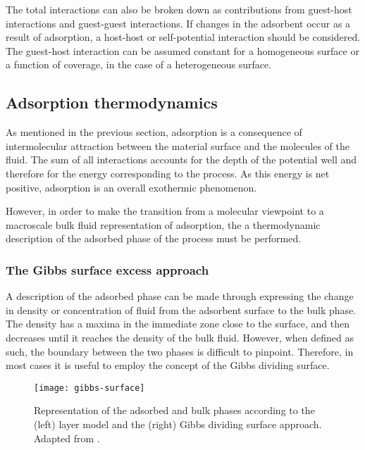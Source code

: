 The total interactions can also be broken down as contributions
from guest-host interactions and guest-guest interactions.
If changes in the adsorbent occur as a result of adsorption,
a host-host or self-potential interaction should be considered.
The guest-host interaction can be assumed constant for a homogeneous
surface or a function of coverage, in the case of a 
heterogeneous surface.

\subsection{Adsorption thermodynamics}

As mentioned in the previous section, adsorption 
is a consequence of intermolecular attraction between the 
material surface and the molecules of the fluid. The sum of 
all interactions accounts for the depth of the potential 
well and therefore for the energy corresponding to the 
process. As this energy is net positive, adsorption is an
overall exothermic phenomenon.

However, in order to make the transition from a molecular 
viewpoint to a macroscale bulk fluid representation of 
adsorption, the a thermodynamic description of the adsorbed 
phase of the process must be performed.

\subsubsection{The Gibbs surface excess approach}

A description of the adsorbed phase can be made through 
expressing the change in density or concentration of fluid
from the adsorbent surface to the bulk phase. The density 
has a maxima in the immediate zone close to the surface, and then
decreases until it reaches the density of the bulk fluid.
However, when defined as such, the boundary between the 
two phases is difficult to pinpoint.
Therefore, in most cases it is useful to employ the concept 
of the Gibbs dividing surface.

\begin{figure}[htb]
  \centering

  \texttt{[image: gibbs-surface]}
  \caption{
    Representation of the adsorbed and bulk phases according to
    the (left) layer model and the (right) Gibbs dividing surface
    approach. Adapted from \citeauthor{rouquerolAdsorptionPowdersPorous2013}%
    \cite{rouquerolAdsorptionPowdersPorous2013}.
  }%
  \label{calo:fig:gibbs-surface}

\end{figure}

